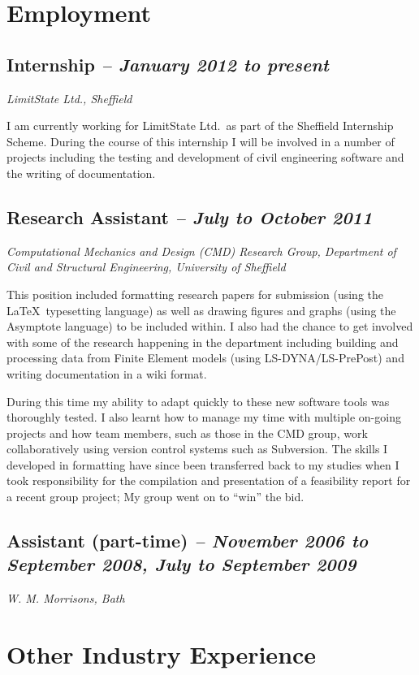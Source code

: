 \documentclass[oneside,a4paper]{article}
\begin{document}
\section*{Employment}

\subsection*{Internship {\it -- January 2012 to present}}
{\it LimitState Ltd., Sheffield}

I am currently working for LimitState Ltd.\ as part of the Sheffield Internship Scheme. During the course of this internship I will be involved in a number of projects including the testing and development of civil engineering software and the writing of documentation.

\subsection*{Research Assistant {\it -- July to October 2011}}
{\it Computational Mechanics and Design (CMD) Research Group, Department of Civil and Structural Engineering, University of Sheffield}

This position included formatting research papers for submission (using the \LaTeX~typesetting language) as well as drawing figures and graphs (using the Asymptote language) to be included within. I also had the chance to get involved with some of the research happening in the department including building and processing data from Finite Element models (using LS-DYNA/LS-PrePost) and writing documentation in a wiki format.

During this time my ability to adapt quickly to these new software tools was thoroughly tested. I also learnt how to manage my time with multiple on-going projects and how team members, such as those in the CMD group, work collaboratively using version control systems such as Subversion. The skills I developed in formatting have since been transferred back to my studies when I took responsibility for the compilation and presentation of a feasibility report for a recent group project; My group went on to ``win'' the bid.

\subsection*{Assistant (part-time) {\it -- November 2006 to September 2008, July to September 2009}}
{\it W. M. Morrisons, Bath}

\section*{Other Industry Experience} %
\end{document}
